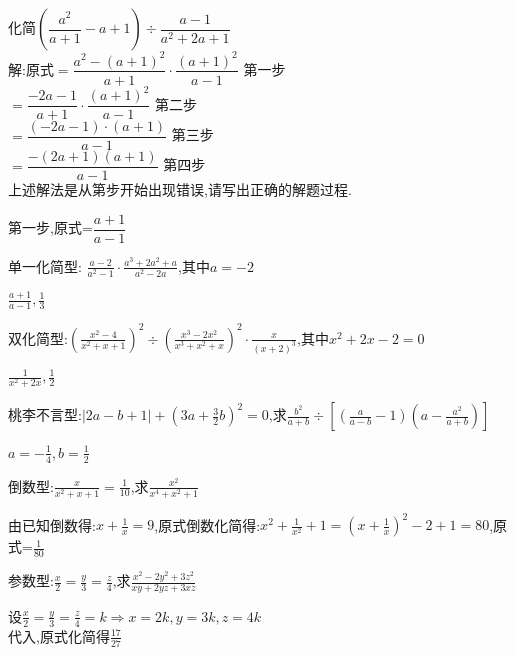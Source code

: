 \documentclass[cn,blue,12pt]{elegantbook}
\renewcommand \tkt[1]{{\CJKunderline[hidden=true, skip=true, thickness=1pt]{#1}}}
\begin{document}
\begin{liti}[resume]
\item 化简\((\dfrac{a^2}{a+1}-a+1)\div \dfrac{a-1}{a^2+2a+1}\)\\
    解:原式\(=\dfrac{a^2-(a+1)^2}{a+1}\cdot \dfrac{(a+1)^2}{a-1}\) \qquad 第一步\\
    \(=\dfrac{-2a-1}{a+1}\cdot \dfrac{(a+1)^2}{a-1}\) \qquad 第二步\\
    \(=\dfrac{(-2a-1)\cdot (a+1)}{a-1}\) \qquad 第三步\\
    \(=\dfrac{-(2a+1)(a+1)}{a-1}\) \qquad 第四步\\
上述解法是从第\tkt{\qquad}步开始出现错误,请写出正确的解题过程.
\begin{solution}
    第一步,原式=\(\dfrac{a+1}{a-1}\)\\
\end{solution}
\item 单一化简型: \(\frac{a-2}{a^2-1}\cdot \frac{a^3+2a^2+a}{a^2-2a}\),其中\(a=-2\)\\
\begin{solution}
        \(\frac{a+1}{a-1}, \frac{1}{3}\)\\
\end{solution}
\item 双化简型:\((\frac{x^2-4}{x^2+x+1})^2 \div (\frac{x^3-2x^2}{x^3+x^2+x})^2\cdot \frac{x}{(x+2)^3}\),其中\(x^2+2x-2=0\)
\begin{solution}
        \(\frac{1}{x^2+2x}, \frac{1}{2}\)\\
\end{solution}
\item 桃李不言型:\(|2a-b+1|+(3a+\frac{3}{2}b)^2=0\),求\(\frac{b^2}{a+b}\div [(\frac{a}{a-b}-1)(a-\frac{a^2}{a+b})]\)
\begin{solution}
        \(a=-\frac{1}{4},b=\frac{1}{2}\)\\
\end{solution}
\item 倒数型:\(\frac{x}{x^2+x+1}=\frac{1}{10}\),求\(\frac{x^2}{x^4+x^2+1}\)
\begin{solution}
        由已知倒数得:\(x+\frac{1}{x}=9\),原式倒数化简得:\(x^2+\frac{1}{x^2}+1=(x+\frac{1}{x})^2-2+1=80\),原式=\(\frac{1}{80}\)\\
\end{solution}
\item 参数型:\(\frac{x}{2}=\frac{y}{3}=\frac{z}{4}\),求\(\frac{x^2-2y^2+3z^2}{xy+2yz+3xz}\)
\begin{solution}
        设\(\frac{x}{2}=\frac{y}{3}=\frac{z}{4}=k \Rightarrow x=2k,y=3k,z=4k\)\\
        代入,原式化简得\(\frac{17}{27}\)
\end{solution}
\end{liti}
\end{document}
